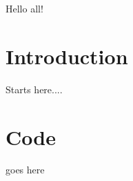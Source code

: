 \documentclass{article}
\begin{document}
Hello all!

\section{Introduction}

Starts here....

\section{Code}

goes here
\end{document}
